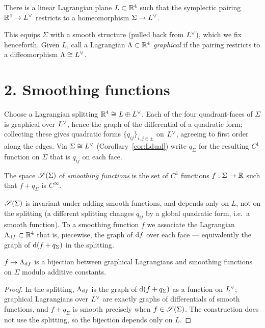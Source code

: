 \documentclass[11pt]{article}
\begin{document}
\begin{qeightcorollary}\label{cor:Ldual}
There is a linear Lagrangian plane $L\subset\mathbb{R}^4$ such that the symplectic
pairing $\mathbb{R}^4\to L^{\vee}$ restricts to a homeomorphism $\Sigma\to L^{\vee}$.
\end{qeightcorollary}

This equips $\Sigma$ with a smooth structure (pulled back from $L^{\vee}$), which
we fix henceforth. Given $L$, call a Lagrangian $\Lambda\subset\mathbb{R}^4$
\emph{graphical} if the pairing restricts to a diffeomorphism $\Lambda\cong L^{\vee}$.

\section*{2. Smoothing functions}

Choose a Lagrangian splitting $\mathbb{R}^4\cong L\oplus L^{\vee}$. Each of the four
quadrant-faces of $\Sigma$ is graphical over $L^{\vee}$, hence the graph of the
differential of a quadratic form; collecting these gives quadratic forms
$\{q_{ij}\}_{i,j\in\pm}$ on $L^{\vee}$, agreeing to first order along the edges.
Via $\Sigma\cong L^{\vee}$ (Corollary~\ref{cor:Ldual}) write $q_\Sigma$ for the
resulting $C^1$ function on $\Sigma$ that is $q_{ij}$ on each face.

\begin{qeightdefinition}\label{def:smoothing}
The space $\mathscr S(\Sigma)$ of \emph{smoothing functions} is the set of $C^1$
functions $f:\Sigma\to\mathbb{R}$ such that $f+q_\Sigma$ is $C^\infty$.
\end{qeightdefinition}

$\mathscr S(\Sigma)$ is invariant under adding smooth functions, and depends only on
$L$, not on the splitting (a different splitting changes $q_{ij}$ by a global
quadratic form, i.e.\ a smooth function). To a smoothing function $f$ we
associate the Lagrangian $\Lambda_{\mathrm d f}\subset\mathbb{R}^4$ that is, piecewise, the graph
of $\mathrm d f$ over each face — equivalently the graph of $\mathrm d(f+q_\Sigma)$ in the
splitting.

\begin{qeightlemma}\label{lem:bijection}
$f\mapsto \Lambda_{\mathrm d f}$ is a bijection between graphical Lagrangians and
smoothing functions on $\Sigma$ modulo additive constants.
\end{qeightlemma}

\begin{proof}
In the splitting, $\Lambda_{\mathrm d f}$ is the graph of $\mathrm d(f+q_\Sigma)$ as a function
on $L^{\vee}$; graphical Lagrangians over $L^{\vee}$ are exactly graphs of
differentials of smooth functions, and $f+q_\Sigma$ is smooth precisely when
$f\in\mathscr S(\Sigma)$. The construction does not use the splitting, so the bijection
depends only on $L$.
\end{proof}
\end{document}
